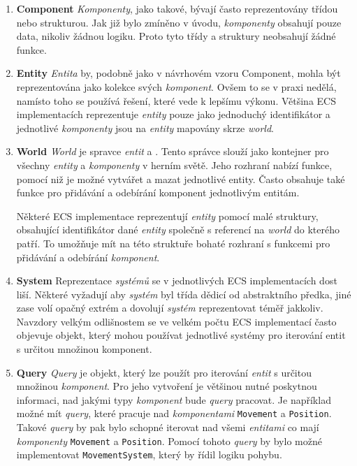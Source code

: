 \begin{enumerate}
    \item \textbf{Component} \textit{Komponenty}, jako takové, bývají často reprezentovány třídou nebo strukturou. Jak již bylo zmíněno v úvodu, \textit{komponenty} obsahují pouze data, nikoliv žádnou logiku. Proto tyto třídy a struktury neobsahují žádné funkce.

    \item \textbf{Entity} \textit{Entita} by, podobně jako v návrhovém vzoru Component, mohla být reprezentována jako kolekce svých \textit{komponent}. Ovšem to se v praxi nedělá, namísto toho se používá řešení, které vede k lepšímu výkonu. Většina ECS implementacích reprezentuje \textit{entity} pouze jako jednoduchý identifikátor a jednotlivé \textit{komponenty} jsou na \textit{entity} mapovány skrze \textit{world}.

    \item \textbf{World} \textit{World} je spravce \textit{entit} a . Tento správce slouží jako kontejner pro všechny \textit{entity} a \textit{komponenty} v herním světě. Jeho rozhraní nabízí funkce, pomocí niž je možné vytvářet a mazat jednotlivé entity. Často obsahuje také funkce pro přidávání a odebírání komponent jednotlivým entitám.

    Některé ECS implementace reprezentují \textit{entity} pomocí malé struktury, obsahující identifikátor dané \textit{entity} společně s referencí na \textit{world} do kterého patří. To umožňuje mít na této struktuře bohaté rozhraní s funkcemi pro přidávání a odebírání \textit{komponent}.

    \item \textbf{System} Reprezentace \textit{systémů} se v jednotlivých ECS implementacích dost liší. Některé vyžadují aby \textit{systém} byl třída dědicí od abstraktního předka, jiné zase volí opačný extrém a dovolují \textit{systém} reprezentovat téměř jakkoliv. Navzdory velkým odlišnostem se ve velkém počtu ECS implementací často objevuje objekt, který mohou používat jednotlivé systémy pro iterování entit s určitou množinou komponent.

    \item \textbf{Query} \textit{Query} je objekt, který lze použít pro iterování \textit{entit} s určitou množinou \textit{komponent}. Pro jeho vytvoření je většinou nutné poskytnou informaci, nad jakými typy \textit{komponent} bude \textit{query} pracovat. Je například možné mít \textit{query}, které pracuje nad \textit{komponentami} \verb|Movement| a \verb|Position|. Takové \textit{query} by pak bylo schopné iterovat nad všemi \textit{entitami} co mají \textit{komponenty} \verb|Movement| a \verb|Position|. Pomocí tohoto \textit{query} by bylo možné implementovat \verb|MovementSystem|, který by řídil logiku pohybu.
\end{enumerate}

